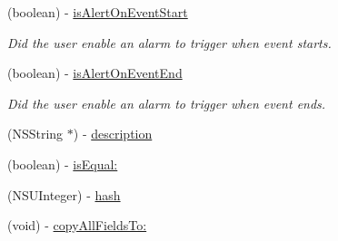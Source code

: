 \begin{DoxyCompactItemize}
(boolean) -\/ \hyperlink{interface_base_event_a1691270b618eacb59f0ac5f0638437ab}{is\+Alert\+On\+Event\+Start}
\begin{DoxyCompactList}\small\item\em Did the user enable an alarm to trigger when event starts. \end{DoxyCompactList}\item 
(boolean) -\/ \hyperlink{interface_base_event_a314fc1374ef4c52c565f76692ea04848}{is\+Alert\+On\+Event\+End}
\begin{DoxyCompactList}\small\item\em Did the user enable an alarm to trigger when event ends. \end{DoxyCompactList}\item 
(N\+S\+String $\ast$) -\/ \hyperlink{interface_base_event_aea05fd643a54c8ead0a23998d360cbff}{description}
\item 
(boolean) -\/ \hyperlink{interface_base_event_a4d0dc712efa28831b9486440fd0158bd}{is\+Equal\+:}
\item 
(N\+S\+U\+Integer) -\/ \hyperlink{interface_base_event_a523c34ab18910db6dff234d02ff9618c}{hash}
\item 
(void) -\/ \hyperlink{interface_base_event_a1221347765786cd64afa74bdcf10c835}{copy\+All\+Fields\+To\+:}
\end{DoxyCompactItemize}

